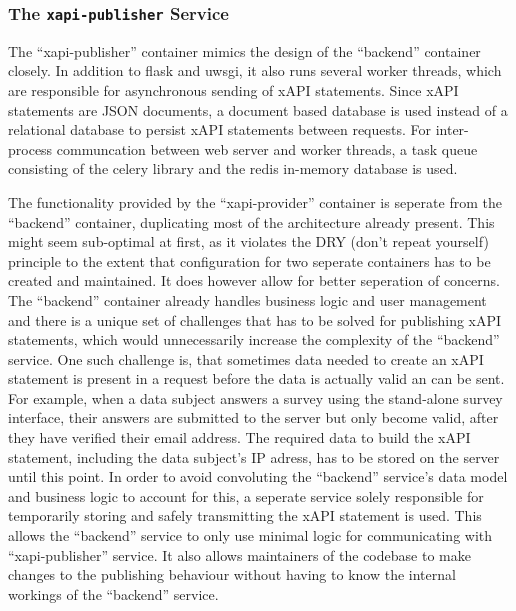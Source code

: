 \documentclass[a4paper,11pt]{article}
\def\inline{\lstinline[basicstyle=\ttfamily,keywordstyle={}]}
\begin{document}
            \subsubsection{The \inline{xapi-publisher} Service}
                The ``xapi-publisher'' container mimics the design of the
                ``backend'' container closely. In addition to flask and uwsgi,
                it also runs several worker threads, which are responsible for
                asynchronous sending of xAPI statements. Since xAPI statements
                are JSON documents, a document based database is used instead
                of a relational database to persist xAPI statements between requests.
                For inter-process communcation between web server and
                worker threads, a task queue consisting of the celery library
                and the redis in-memory database is used.

                The functionality provided by the ``xapi-provider'' container
                is seperate from the ``backend'' container, duplicating
                most of the architecture already present. This might seem
                sub-optimal at first, as it violates the DRY (don't repeat yourself)
                principle to the extent that configuration for two seperate containers
                has to be created and maintained. It does however allow for better
                seperation of concerns. The ``backend'' container already
                handles business logic and user management and there is a unique
                set of challenges that has to be solved for publishing xAPI
                statements, which would unnecessarily increase the complexity
                of the ``backend'' service. One such challenge is, that sometimes
                data needed to create an xAPI statement is present in a request
                before the data is actually valid an can be sent. For example,
                when a data subject answers a survey using the stand-alone survey
                interface, their answers are submitted to the server but only
                become valid, after they have verified their email address.
                The required data to build the xAPI statement, including the data
                subject's IP adress, has to be stored on the server until this
                point. In order to avoid convoluting the ``backend'' service's
                data model and business logic to account for this, a seperate
                service solely responsible for temporarily storing and safely 
                transmitting the xAPI statement is used.
                This allows the ``backend'' service to only use minimal logic
                for communicating with ``xapi-publisher'' service.
                It also allows maintainers of the codebase to make changes
                to the publishing behaviour without having to know the internal
                workings of the ``backend'' service. 
\end{document}
